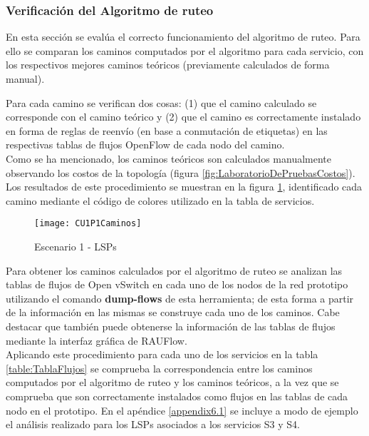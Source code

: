 
\subsubsection{Verificaci\'on del Algoritmo de ruteo}
En esta secci\'on se eval\'ua el correcto funcionamiento del algoritmo de ruteo. Para ello se comparan los caminos computados por el algoritmo para cada servicio, con los respectivos mejores caminos te\'oricos (previamente calculados de forma manual). 

Para cada camino se verifican dos cosas: (1) que el camino calculado se corresponde con el camino te\'orico y (2) que el camino es correctamente instalado en forma de reglas de reenvío (en base a conmutaci\'on de etiquetas) en las respectivas tablas de flujos OpenFlow de cada nodo del camino.\\

Como se ha mencionado, los caminos te\'oricos son calculados manualmente observando los costos de la topolog\'ia (figura \ref{fig:LaboratorioDePruebasCostos}). Los resultados de este procedimiento se muestran en la figura \ref{fig:CUP1Caminos}, identificado cada camino mediante el código de colores utilizado en la tabla de servicios.\\

\begin{figure}[ht!] 
\centering    
\texttt{[image: CU1P1Caminos]}
\caption[Escenario 1 - LSPs]{Escenario 1 - LSPs}
\label{fig:CUP1Caminos}
\end{figure}

Para obtener los caminos calculados por el algoritmo de ruteo se analizan las tablas de flujos de Open vSwitch en cada uno de los nodos de la red prototipo utilizando el comando \textbf{dump-flows} de esta herramienta; de esta forma a partir de la informaci\'on en las mismas se construye cada uno de los caminos. Cabe destacar que tambi\'en puede obtenerse la informaci\'on de las tablas de flujos mediante la interfaz gráfica de RAUFlow.\\

Aplicando este procedimiento para cada uno de los servicios en la tabla \ref{table:TablaFlujos} se comprueba la correspondencia entre los caminos computados por el algoritmo de ruteo y los caminos te\'oricos, a la vez que se comprueba que son correctamente instalados como flujos en las tablas de cada nodo en el prototipo. En el apéndice \ref{appendix6.1} se incluye a modo de ejemplo el análisis realizado para los LSPs asociados a los servicios S3 y S4.\\ 
 
